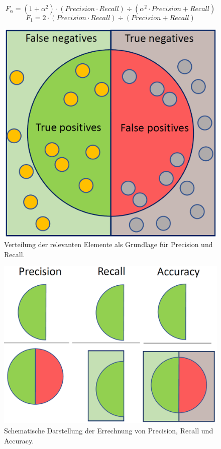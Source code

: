 \begin{equation}
F_\alpha = (1 + \alpha^2) \cdot (Precision \cdot Recall) \div (\alpha^2 \cdot Precision + Recall) 
\label{eq:f1} 
\end{equation}
\begin{equation}
F_1 = 2 \cdot (Precision \cdot Recall) \div (Precision + Recall) 
\label{eq:f1b} 
\end{equation}
\begin{figure}[H]
\centering
\includegraphics[scale=0.4]{pictures/grafiken/PrecisionRecall}
\caption{Verteilung der relevanten Elemente als Grundlage für Precision und Recall.}
\label{fig:prerec}
\end{figure}
\begin{figure}[H]
\centering
\includegraphics[scale=0.4]{pictures/grafiken/prerecacc}
\caption{Schematische Darstellung der Errechnung von Precision, Recall und Accuracy.}
\label{fig:prerecacc}
\end{figure}

